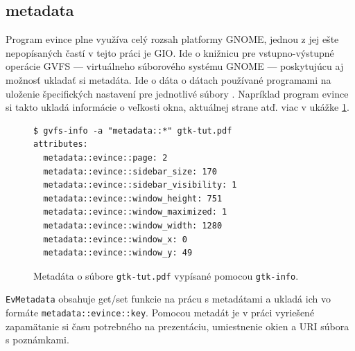 \documentclass[12pt,oneside,final]{fithesis2}
\begin{document}
\subsection{metadata}
Program evince plne využíva celý rozsah platformy GNOME, jednou z jej ešte nepopísaných častí v tejto práci je GIO. Ide o knižnicu pre vstupno-výstupné operácie GVFS --- virtuálneho súborového systému GNOME --- poskytujúcu aj možnosť ukladať si metadáta. Ide o dáta o dátach používané programami na uloženie špecifických nastavení pre jednotlivé súbory \cite{metad}. Napríklad program evince si takto ukladá informácie o veľkosti okna, aktuálnej strane atď. viac v ukážke \ref{meta}.
\begin{figure}[hbpt]
\begin{tiny}
\begin{verbatim}
$ gvfs-info -a "metadata::*" gtk-tut.pdf 
attributes:
  metadata::evince::page: 2
  metadata::evince::sidebar_size: 170
  metadata::evince::sidebar_visibility: 1
  metadata::evince::window_height: 751
  metadata::evince::window_maximized: 1
  metadata::evince::window_width: 1280
  metadata::evince::window_x: 0
  metadata::evince::window_y: 49
\end{verbatim}
\end{tiny}
\caption{Metadáta o súbore \texttt{gtk-tut.pdf} vypísané pomocou \texttt{gtk-info}.}
\label{meta}
\end{figure}


\texttt{EvMetadata} obsahuje get/set funkcie na prácu s metadátami a ukladá ich vo formáte \texttt{metadata::evince::key}. Pomocou metadát je v práci vyriešené zapamätanie si času potrebného na prezentáciu, umiestnenie okien a URI súbora s poznámkami.
\end{document}
